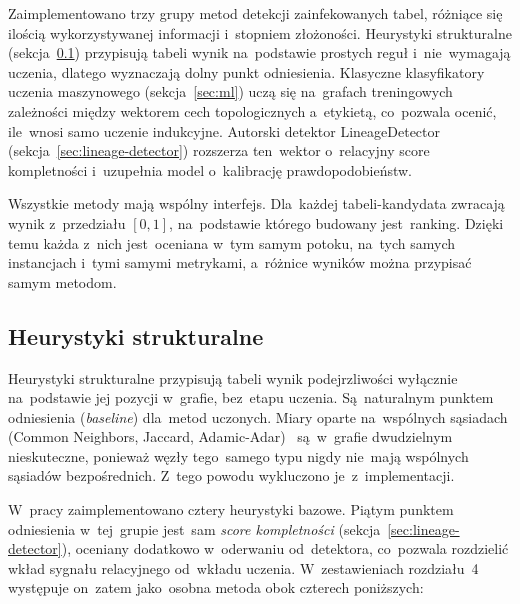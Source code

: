 Zaimplementowano trzy grupy metod detekcji zainfekowanych tabel, różniące się
ilością wykorzystywanej informacji i~stopniem złożoności. Heurystyki strukturalne
(sekcja~\ref{sec:heurystyki}) przypisują tabeli wynik na~podstawie prostych
reguł i~nie~wymagają uczenia, dlatego wyznaczają dolny punkt odniesienia.
Klasyczne klasyfikatory uczenia maszynowego (sekcja~\ref{sec:ml}) uczą się
na~grafach treningowych zależności między wektorem cech topologicznych
a~etykietą, co~pozwala ocenić, ile~wnosi samo uczenie indukcyjne. Autorski
detektor LineageDetector (sekcja~\ref{sec:lineage-detector}) rozszerza ten~wektor
o~relacyjny score kompletności i~uzupełnia model o~kalibrację prawdopodobieństw.

Wszystkie metody mają wspólny interfejs. Dla~każdej tabeli-kandydata zwracają
wynik z~przedziału $[0, 1]$, na~podstawie którego budowany jest~ranking. Dzięki
temu każda z~nich jest~oceniana w~tym samym potoku, na~tych samych instancjach
i~tymi samymi metrykami, a~różnice wyników można przypisać samym metodom.

\subsection{Heurystyki strukturalne}
\label{sec:heurystyki}

Heurystyki strukturalne przypisują tabeli wynik podejrzliwości wyłącznie
na~podstawie jej pozycji w~grafie, bez~etapu uczenia. Są~naturalnym
punktem odniesienia (\emph{baseline}) dla~metod uczonych. Miary oparte
na~wspólnych sąsiadach (Common Neighbors, Jaccard,
Adamic-Adar)~\cite{LibenNowell2007} są~w~grafie
dwudzielnym nieskuteczne, ponieważ węzły tego~samego typu nigdy nie~mają
wspólnych sąsiadów bezpośrednich. Z~tego powodu wykluczono je~z~implementacji.

W~pracy zaimplementowano cztery heurystyki bazowe. Piątym punktem
odniesienia w~tej~grupie jest~sam \emph{score kompletności}
(sekcja~\ref{sec:lineage-detector}), oceniany dodatkowo w~oderwaniu
od~detektora, co~pozwala rozdzielić wkład sygnału relacyjnego od~wkładu
uczenia. W~zestawieniach rozdziału~4 występuje on~zatem jako~osobna metoda
obok czterech poniższych:

